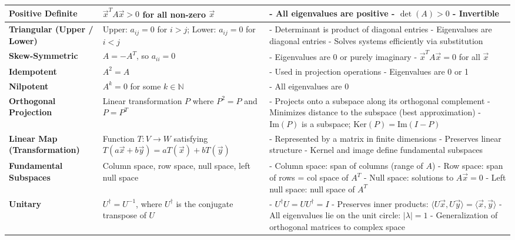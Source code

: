 \documentclass[12pt]{article}
\begin{document}
\begin{longtable}{|>{\bfseries}m{3.5cm}|m{5cm}|m{7cm}|}
  \hline
  Positive Definite & $\vec{x}^T A \vec{x} > 0$ for all non-zero $\vec{x}$ &
  - All eigenvalues are positive \newline
  - $\det(A) > 0$ \newline
  - Invertible \\
  \hline
  Triangular (Upper / Lower) &
  Upper: $a_{ij} = 0$ for $i > j$; Lower: $a_{ij} = 0$ for $i < j$ &
  - Determinant is product of diagonal entries \newline
  - Eigenvalues are diagonal entries \newline
  - Solves systems efficiently via substitution \\
  \hline
  Skew-Symmetric & $A = -A^T$, so $a_{ii} = 0$ &
  - Eigenvalues are 0 or purely imaginary \newline
  - $\vec{x}^T A \vec{x} = 0$ for all $\vec{x}$ \\
  \hline
  Idempotent & $A^2 = A$ &
  - Used in projection operations \newline
  - Eigenvalues are 0 or 1 \\
  \hline
  Nilpotent & $A^k = 0$ for some $k \in \mathbb{N}$ &
  - All eigenvalues are 0 \\
  \hline
  \hline
  Orthogonal Projection & Linear transformation $P$ where $P^2 = P$
  and $P = P^T$ &
  - Projects onto a subspace along its orthogonal complement \newline
  - Minimizes distance to the subspace (best approximation) \newline
  - $\text{Im}(P)$ is a subspace; $\text{Ker}(P) = \text{Im}(I - P)$ \\
  \hline
  Linear Map (Transformation) & Function $T: V \rightarrow W$
  satisfying $T(a\vec{x} + b\vec{y}) = aT(\vec{x}) + bT(\vec{y})$ &
  - Represented by a matrix in finite dimensions \newline
  - Preserves linear structure \newline
  - Kernel and image define fundamental subspaces \\
  \hline
  Fundamental Subspaces & Column space, row space, null space, left null space &
  - Column space: span of columns (range of $A$) \newline
  - Row space: span of rows = col space of $A^T$ \newline
  - Null space: solutions to $A\vec{x} = 0$ \newline
  - Left null space: null space of $A^T$ \\
  \hline
  Unitary & $U^\dagger = U^{-1}$, where $U^\dagger$ is the conjugate
  transpose of $U$ &
  - $U^\dagger U = U U^\dagger = I$ \newline
  - Preserves inner products: $\langle U\vec{x}, U\vec{y} \rangle =
  \langle \vec{x}, \vec{y} \rangle$ \newline
  - All eigenvalues lie on the unit circle: $|\lambda| = 1$ \newline
  - Generalization of orthogonal matrices to complex space \\
  \hline

\end{longtable}
\end{document}
